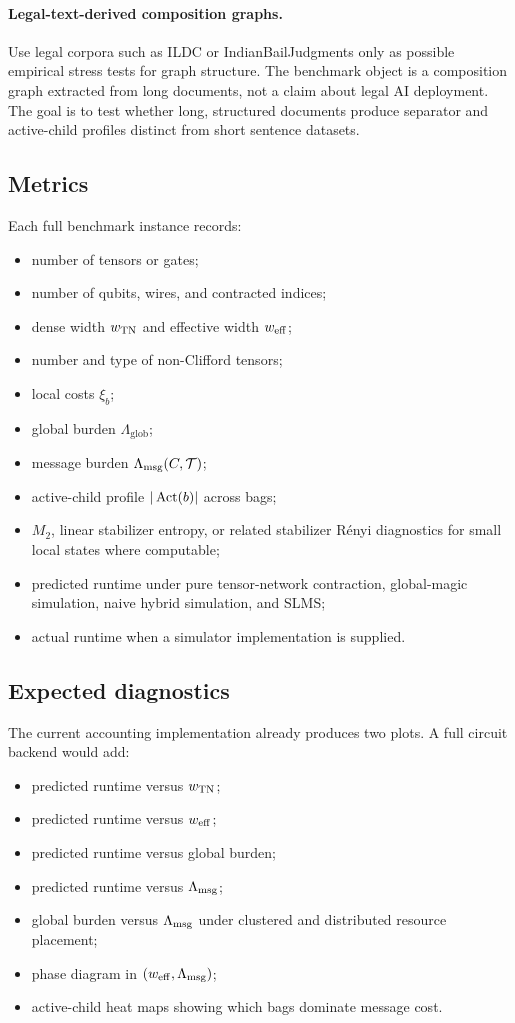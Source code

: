 \paragraph{Legal-text-derived composition graphs.}
Use legal corpora such as ILDC or IndianBailJudgments only as possible empirical stress tests for graph structure. The benchmark object is a composition graph extracted from long documents, not a claim about legal AI deployment. The goal is to test whether long, structured documents produce separator and active-child profiles distinct from short sentence datasets.

\subsection{Metrics}

Each full benchmark instance records:
\begin{itemize}[leftmargin=1.2cm]
\item number of tensors or gates;
\item number of qubits, wires, and contracted indices;
\item dense width \(w_{\mathrm{TN}}\) and effective width \(w_{\mathrm{eff}}\);
\item number and type of non-Clifford tensors;
\item local costs \(\xi_b\);
\item global burden \(\Lambda_{\mathrm{glob}}\);
\item message burden \(\Lambda_{\mathrm{msg}}(C,\mathcal{T})\);
\item active-child profile \(|\operatorname{Act}(b)|\) across bags;
\item \(M_2\), linear stabilizer entropy, or related stabilizer R\'enyi diagnostics for small local states where computable;
\item predicted runtime under pure tensor-network contraction, global-magic simulation, naive hybrid simulation, and SLMS;
\item actual runtime when a simulator implementation is supplied.
\end{itemize}

\subsection{Expected diagnostics}

The current accounting implementation already produces two plots. A full circuit backend would add:
\begin{itemize}[leftmargin=1.2cm]
\item predicted runtime versus \(w_{\mathrm{TN}}\);
\item predicted runtime versus \(w_{\mathrm{eff}}\);
\item predicted runtime versus global burden;
\item predicted runtime versus \(\Lambda_{\mathrm{msg}}\);
\item global burden versus \(\Lambda_{\mathrm{msg}}\) under clustered and distributed resource placement;
\item phase diagram in \((w_{\mathrm{eff}},\Lambda_{\mathrm{msg}})\);
\item active-child heat maps showing which bags dominate message cost.
\end{itemize}

